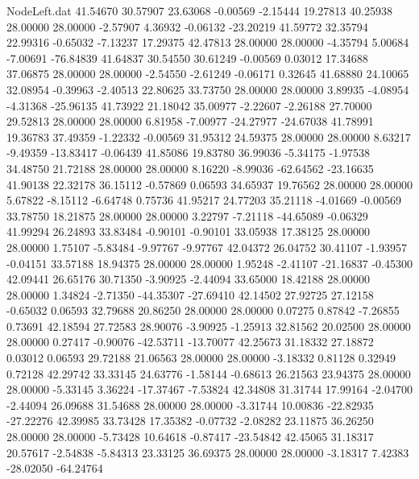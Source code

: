 \begin{filecontents}{NodeLeft.dat}
  41.54670   30.57907   23.63068    -0.00569   -2.15444   19.27813   40.25938   28.00000   28.00000   -2.57907    4.36932   -0.06132  -23.20219
  41.59772   32.35794   22.99316    -0.65032   -7.13237   17.29375   42.47813   28.00000   28.00000   -4.35794    5.00684   -7.00691  -76.84839
  41.64837   30.54550   30.61249    -0.00569    0.03012   17.34688   37.06875   28.00000   28.00000   -2.54550   -2.61249   -0.06171    0.32645
  41.68880   24.10065   32.08954    -0.39963   -2.40513   22.80625   33.73750   28.00000   28.00000    3.89935   -4.08954   -4.31368  -25.96135
  41.73922   21.18042   35.00977    -2.22607   -2.26188   27.70000   29.52813   28.00000   28.00000    6.81958   -7.00977  -24.27977  -24.67038
  41.78991   19.36783   37.49359    -1.22332   -0.00569   31.95312   24.59375   28.00000   28.00000    8.63217   -9.49359  -13.83417   -0.06439
  41.85086   19.83780   36.99036    -5.34175   -1.97538   34.48750   21.72188   28.00000   28.00000    8.16220   -8.99036  -62.64562  -23.16635
  41.90138   22.32178   36.15112    -0.57869    0.06593   34.65937   19.76562   28.00000   28.00000    5.67822   -8.15112   -6.64748    0.75736
  41.95217   24.77203   35.21118    -4.01669   -0.00569   33.78750   18.21875   28.00000   28.00000    3.22797   -7.21118  -44.65089   -0.06329
  41.99294   26.24893   33.83484    -0.90101   -0.90101   33.05938   17.38125   28.00000   28.00000    1.75107   -5.83484   -9.97767   -9.97767
  42.04372   26.04752   30.41107    -1.93957   -0.04151   33.57188   18.94375   28.00000   28.00000    1.95248   -2.41107  -21.16837   -0.45300
  42.09441   26.65176   30.71350    -3.90925   -2.44094   33.65000   18.42188   28.00000   28.00000    1.34824   -2.71350  -44.35307  -27.69410
  42.14502   27.92725   27.12158    -0.65032    0.06593   32.79688   20.86250   28.00000   28.00000    0.07275    0.87842   -7.26855    0.73691
  42.18594   27.72583   28.90076    -3.90925   -1.25913   32.81562   20.02500   28.00000   28.00000    0.27417   -0.90076  -42.53711  -13.70077
  42.25673   31.18332   27.18872     0.03012    0.06593   29.72188   21.06563   28.00000   28.00000   -3.18332    0.81128    0.32949    0.72128
  42.29742   33.33145   24.63776    -1.58144   -0.68613   26.21563   23.94375   28.00000   28.00000   -5.33145    3.36224  -17.37467   -7.53824
  42.34808   31.31744   17.99164    -2.04700   -2.44094   26.09688   31.54688   28.00000   28.00000   -3.31744   10.00836  -22.82935  -27.22276
  42.39985   33.73428   17.35382    -0.07732   -2.08282   23.11875   36.26250   28.00000   28.00000   -5.73428   10.64618   -0.87417  -23.54842
  42.45065   31.18317   20.57617    -2.54838   -5.84313   23.33125   36.69375   28.00000   28.00000   -3.18317    7.42383  -28.02050  -64.24764

\end{filecontents}
